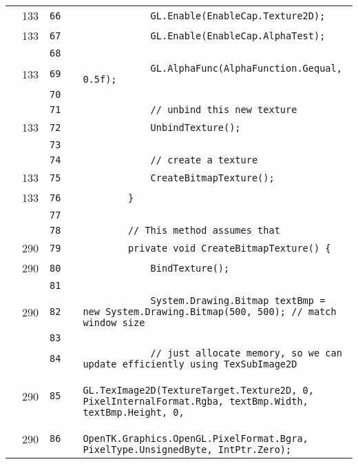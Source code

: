 \documentclass[a4paper,landscape,10pt]{article}
\begin{document}
\begin{longtable}[l]{lrrll}
\cellcolor{green} & 133 & \verb~66~ & & \verb~            GL.Enable(EnableCap.Texture2D);~\\
\cellcolor{green} & 133 & \verb~67~ & & \verb~            GL.Enable(EnableCap.AlphaTest);~\\
\cellcolor{gray} &  & \verb~68~ & & \verb~~\\
\cellcolor{green} & 133 & \verb~69~ & & \verb~            GL.AlphaFunc(AlphaFunction.Gequal, 0.5f);~\\
\cellcolor{gray} &  & \verb~70~ & & \verb~~\\
\cellcolor{gray} &  & \verb~71~ & & \verb~            // unbind this new texture~\\
\cellcolor{green} & 133 & \verb~72~ & & \verb~            UnbindTexture();~\\
\cellcolor{gray} &  & \verb~73~ & & \verb~~\\
\cellcolor{gray} &  & \verb~74~ & & \verb~            // create a texture~\\
\cellcolor{green} & 133 & \verb~75~ & & \verb~            CreateBitmapTexture();~\\
\cellcolor{green} & 133 & \verb~76~ & & \verb~        }~\\
\cellcolor{gray} &  & \verb~77~ & & \verb~~\\
\cellcolor{gray} &  & \verb~78~ & & \verb~        // This method assumes that~\\
\cellcolor{green} & 290 & \verb~79~ & & \verb~        private void CreateBitmapTexture() {~\\
\cellcolor{green} & 290 & \verb~80~ & & \verb~            BindTexture();~\\
\cellcolor{gray} &  & \verb~81~ & & \verb~~\\
\cellcolor{green} & 290 & \verb~82~ & & \verb~            System.Drawing.Bitmap textBmp = new System.Drawing.Bitmap(500, 500); // match window size~\\
\cellcolor{gray} &  & \verb~83~ & & \verb~~\\
\cellcolor{gray} &  & \verb~84~ & & \verb~            // just allocate memory, so we can update efficiently using TexSubImage2D~\\
\cellcolor{green} & 290 & \verb~85~ & & \verb~            GL.TexImage2D(TextureTarget.Texture2D, 0, PixelInternalFormat.Rgba, textBmp.Width, textBmp.Height, 0,~\\
\cellcolor{green} & 290 & \verb~86~ & & \verb~                OpenTK.Graphics.OpenGL.PixelFormat.Bgra, PixelType.UnsignedByte, IntPtr.Zero);~\\

\end{longtable}
\end{document}
